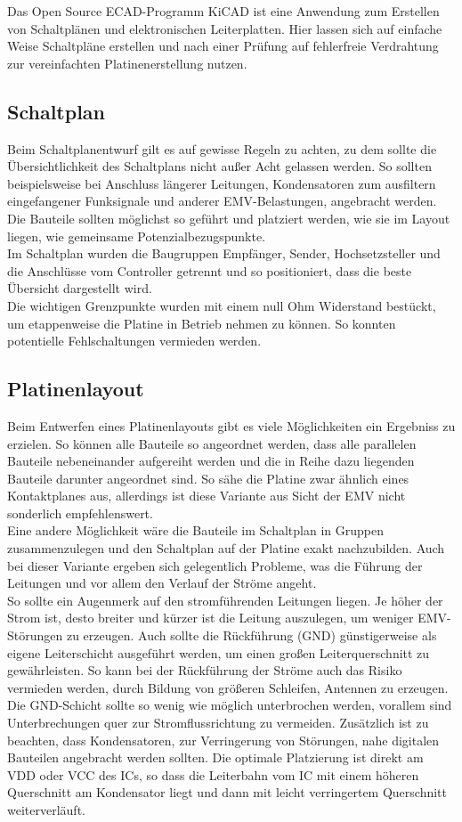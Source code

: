 
Das Open Source ECAD-Programm KiCAD ist eine Anwendung zum Erstellen von Schaltplänen und elektronischen Leiterplatten. Hier lassen sich auf einfache Weise Schaltpläne erstellen und nach einer Prüfung auf fehlerfreie Verdrahtung zur vereinfachten Platinenerstellung nutzen. 

\subsection{Schaltplan}
Beim Schaltplanentwurf gilt es auf gewisse Regeln zu achten, zu dem sollte die Übersichtlichkeit des Schaltplans nicht außer Acht gelassen werden.
So sollten beispielsweise bei Anschluss längerer Leitungen, Kondensatoren zum ausfiltern eingefangener Funksignale und anderer EMV-Belastungen, angebracht werden. Die Bauteile sollten möglichst so geführt und platziert werden, wie sie im Layout liegen, wie gemeinsame Potenzialbezugspunkte.\\
Im Schaltplan wurden die Baugruppen Empfänger, Sender, Hochsetzsteller und die Anschlüsse vom Controller getrennt und so positioniert, dass die beste Übersicht dargestellt wird.\\
Die wichtigen Grenzpunkte wurden mit einem null Ohm Widerstand bestückt, um etappenweise die Platine in Betrieb nehmen zu können. So konnten potentielle Fehlschaltungen vermieden werden.\\

\subsection{Platinenlayout}
Beim Entwerfen eines Platinenlayouts gibt es viele Möglichkeiten ein Ergebniss zu erzielen. So können alle Bauteile so angeordnet werden, dass alle parallelen Bauteile nebeneinander aufgereiht werden und die in Reihe dazu liegenden Bauteile darunter angeordnet sind. So sähe die Platine zwar ähnlich eines Kontaktplanes aus, allerdings ist diese Variante aus Sicht der EMV nicht sonderlich empfehlenswert.\\
Eine andere Möglichkeit wäre die Bauteile im Schaltplan in Gruppen zusammenzulegen und den Schaltplan auf der Platine exakt nachzubilden. Auch bei dieser Variante ergeben sich gelegentlich Probleme, was die Führung der Leitungen und vor allem den Verlauf der Ströme angeht.\\
So sollte ein Augenmerk auf den stromführenden Leitungen liegen. Je höher der Strom ist, desto breiter und kürzer ist die Leitung auszulegen, um weniger EMV-Störungen zu erzeugen. Auch sollte die Rückführung (GND) günstigerweise als eigene Leiterschicht ausgeführt werden, um einen großen Leiterquerschnitt zu gewährleisten. So kann bei der Rückführung der Ströme auch das Risiko vermieden werden, durch Bildung von größeren Schleifen, Antennen zu erzeugen. Die GND-Schicht sollte so wenig wie möglich unterbrochen werden, vorallem sind Unterbrechungen quer zur Stromflussrichtung zu vermeiden. Zusätzlich ist zu beachten, dass Kondensatoren, zur Verringerung von Störungen, nahe digitalen Bauteilen angebracht werden sollten. Die optimale Platzierung ist direkt am VDD oder VCC des ICs, so dass die Leiterbahn vom IC mit einem höheren Querschnitt am Kondensator liegt und dann mit leicht verringertem Querschnitt weiterverläuft.


